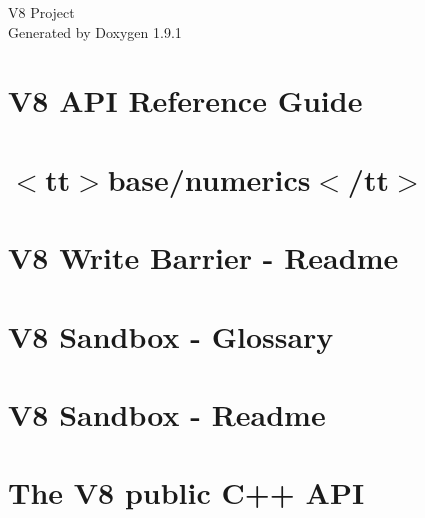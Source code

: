 \let\mypdfximage\pdfximage\def\pdfximage{\immediate\mypdfximage}\documentclass[twoside]{book}
\newcommand{\+}{\discretionary{\mbox{\scriptsize$\hookleftarrow$}}{}{}}
\newcommand{\clearemptydoublepage}{%
  \newpage{\pagestyle{empty}\cleardoublepage}%
}
\begin{document}
\raggedbottom

\hypersetup{pageanchor=false,
             bookmarksnumbered=true,
             pdfencoding=unicode
            }
\begin{titlepage}
\vspace*{7cm}
\begin{center}%
{\Large V8 Project }\\
\vspace*{1cm}
{\large Generated by Doxygen 1.9.1}\\
\end{center}
\end{titlepage}
\clearemptydoublepage
{}
\tableofcontents
\clearemptydoublepage
{}
\hypersetup{pageanchor=true}

\chapter{V8 API Reference Guide}
\label{index}\hypertarget{index}{}
\chapter{$<$tt$>$base/numerics$<$/tt$>$}
\label{md__mnt_V8SourceCode_src_base_numerics_README}

\chapter{V8 Write Barrier -\/ Readme}
\label{md__mnt_V8SourceCode_src_heap_WRITE_BARRIER}

\chapter{V8 Sandbox -\/ Glossary}
\label{md__mnt_V8SourceCode_src_sandbox_GLOSSARY}

\chapter{V8 Sandbox -\/ Readme}
\label{md__mnt_V8SourceCode_src_sandbox_README}

\chapter{The V8 public C++ API}
\label{md__mnt_V8SourceCode_include_APIDesign}

\end{document}
